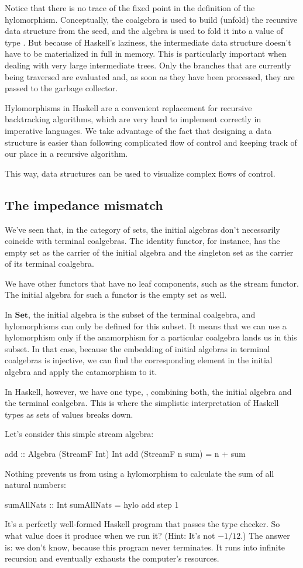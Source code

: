 \documentclass[DaoFP]{subfiles}
\begin{document}
Notice that there is no trace of the fixed point in the definition of the hylomorphism. Conceptually, the coalgebra is used to build (unfold) the recursive data structure from the seed, and the algebra is used to fold it into a value of type . But because of Haskell's laziness, the intermediate data structure doesn't have to be materialized in full in memory. This is particularly important when dealing with very large intermediate trees. Only the branches that are currently being traversed are evaluated and, as soon as they have been processed, they are passed to the garbage collector. 

Hylomorphisms in Haskell are a convenient replacement for recursive backtracking algorithms, which are very hard to implement correctly in imperative languages. We take advantage of the fact that designing a data structure is easier than following complicated flow of control and keeping track of our place in a recursive algorithm. 

This way, data structures can be used to visualize complex flows of control.

\subsection{The impedance mismatch}
We've seen that, in the category of sets, the initial algebras don't necessarily coincide with terminal coalgebras. The identity functor, for instance, has the empty set as the carrier of the initial algebra and the singleton set as the carrier of its terminal coalgebra. 

We have other functors that have no leaf components, such as the stream functor. The initial algebra for such a functor is the empty set as well. 

In $\mathbf{Set}$, the initial algebra is the subset of the terminal coalgebra, and hylomorphisms can only be defined for this subset. It means that we can use a hylomorphism only if the anamorphism for a particular coalgebra lands us in this subset. In that case, because the embedding of initial algebras in terminal coalgebras is injective, we can find the corresponding element in the initial algebra and apply the catamorphism to it.

In Haskell, however, we have one type, , combining both, the initial algebra and the terminal coalgebra. This is where the simplistic interpretation of Haskell types as sets of values breaks down. 

Let's consider this simple stream algebra:
\begin{haskell}
add :: Algebra (StreamF Int) Int
add (StreamF n sum) = n + sum
\end{haskell}
Nothing prevents us from using a hylomorphism to calculate the sum of all natural numbers:
\begin{haskell}
sumAllNats :: Int
sumAllNats = hylo add step 1
\end{haskell}
It's a perfectly well-formed Haskell program that passes the type checker. So what value does it produce when we run it? (Hint: It's not $-1/12$.) The answer is: we don't know, because this program never terminates. It runs into infinite recursion and eventually exhausts the computer's resources.
\end{document}
